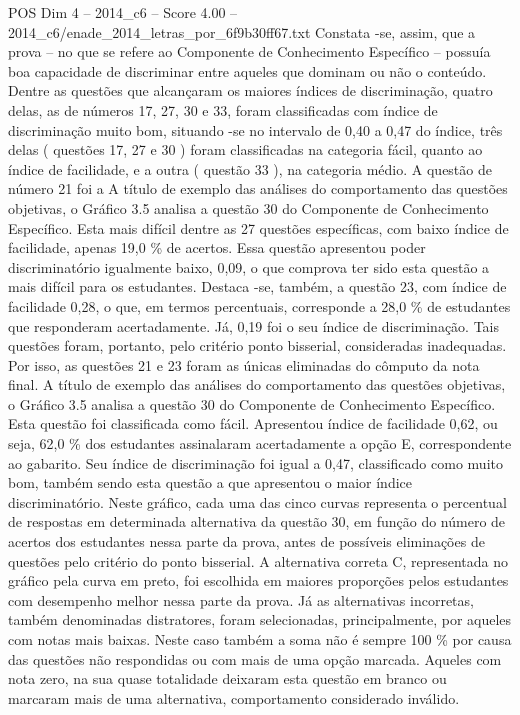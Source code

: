 \begin{textsample}{POS Dim 4 – 2014\_c6 – Score 4.00 – 2014\_c6/enade\_2014\_letras\_por\_6f9b30ff67.txt}
Constata -se, assim, que a prova – no que se refere ao Componente de Conhecimento Específico – possuía boa capacidade de discriminar entre aqueles que dominam ou não o conteúdo.
Dentre as questões que alcançaram os maiores índices de discriminação, quatro delas, as de números 17, 27, 30 e 33, foram classificadas com índice de discriminação muito bom, situando -se no intervalo de 0,40 a 0,47 do índice, três delas ( questões 17, 27 e 30 ) foram classificadas na categoria fácil, quanto ao índice de facilidade, e a outra ( questão 33 ), na categoria médio.
A questão de número 21 foi a A título de exemplo das análises do comportamento das questões objetivas, o Gráfico 3.5 analisa a questão 30 do Componente de Conhecimento Específico.
Esta mais difícil dentre as 27 questões específicas, com baixo índice de facilidade, apenas 19,0 \% de acertos.
Essa questão apresentou poder discriminatório igualmente baixo, 0,09, o que comprova ter sido esta questão a mais difícil para os estudantes.
Destaca -se, também, a questão 23, com índice de facilidade 0,28, o que, em termos percentuais, corresponde a 28,0 \% de estudantes que responderam acertadamente.
Já, 0,19 foi o seu índice de discriminação.
Tais questões foram, portanto, pelo critério ponto bisserial, consideradas inadequadas.
Por isso, as questões 21 e 23 foram as únicas eliminadas do cômputo da nota final.
A título de exemplo das análises do comportamento das questões objetivas, o Gráfico 3.5 analisa a questão 30 do Componente de Conhecimento Específico.
Esta questão foi classificada como fácil.
Apresentou índice de facilidade 0,62, ou seja, 62,0 \% dos estudantes assinalaram acertadamente a opção E, correspondente ao gabarito.
Seu índice de discriminação foi igual a 0,47, classificado como muito bom, também sendo esta questão a que apresentou o maior índice discriminatório.
Neste gráfico, cada uma das cinco curvas representa o percentual de respostas em determinada alternativa da questão 30, em função do número de acertos dos estudantes nessa parte da prova, antes de possíveis eliminações de questões pelo critério do ponto bisserial.
A alternativa correta C, representada no gráfico pela curva em preto, foi escolhida em maiores proporções pelos estudantes com desempenho melhor nessa parte da prova.
Já as alternativas incorretas, também denominadas distratores, foram selecionadas, principalmente, por aqueles com notas mais baixas.
Neste caso também a soma não é sempre 100 \% por causa das questões não respondidas ou com mais de uma opção marcada.
Aqueles com nota zero, na sua quase totalidade deixaram esta questão em branco ou marcaram mais de uma alternativa, comportamento considerado inválido.

\end{textsample}
